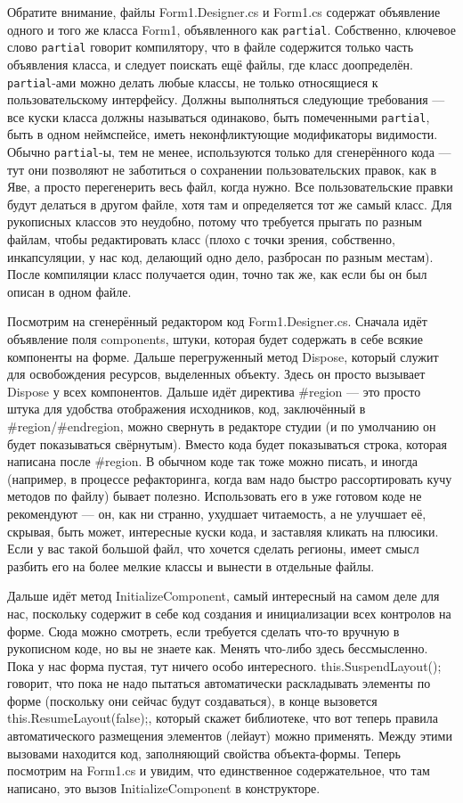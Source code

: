 \documentclass[a5paper]{article}
\begin{document}
Обратите внимание, файлы Form1.Designer.cs и Form1.cs содержат объявление одного и того же класса Form1, объявленного как \texttt{partial}. Собственно, ключевое слово \texttt{partial} говорит компилятору, что в файле содержится только часть объявления класса, и следует поискать ещё файлы, где класс доопределён. \texttt{partial}-ами можно делать любые классы, не только относящиеся к пользовательскому интерфейсу. Должны выполняться следующие требования --- все куски класса должны называться одинаково, быть помеченными \texttt{partial}, быть в одном неймспейсе, иметь неконфликтующие модификаторы видимости. Обычно \texttt{partial}-ы, тем не менее, используются только для сгенерённого кода --- тут они позволяют не заботиться о сохранении пользовательских правок, как в Яве, а просто перегенерить весь файл, когда нужно. Все пользовательские правки будут делаться в другом файле, хотя там и определяется тот же самый класс. Для рукописных классов это неудобно, потому что требуется прыгать по разным файлам, чтобы редактировать класс (плохо с точки зрения, собственно, инкапсуляции, у нас код, делающий одно дело, разбросан по разным местам). После компиляции класс получается один, точно так же, как если бы он был описан в одном файле.

Посмотрим на сгенерённый редактором код Form1.Designer.cs. Сначала идёт объявление поля components, штуки, которая будет содержать в себе всякие компоненты на форме. Дальше перегруженный метод Dispose, который служит для освобождения ресурсов, выделенных объекту. Здесь он просто вызывает Dispose у всех компонентов. Дальше идёт директива \#region --- это просто штука для удобства отображения исходников, код, заключённый в \#region/\#endregion, можно свернуть в редакторе студии (и по умолчанию он будет показываться свёрнутым). Вместо кода будет показываться строка, которая написана после \#region. В обычном коде так тоже можно писать, и иногда (например, в процессе рефакторинга, когда вам надо быстро рассортировать кучу методов по файлу) бывает полезно. Использовать его в уже готовом коде не рекомендуют --- он, как ни странно, ухудшает читаемость, а не улучшает её, скрывая, быть может, интересные куски кода, и заставляя кликать на плюсики. Если у вас такой большой файл, что хочется сделать регионы, имеет смысл разбить его на более мелкие классы и вынести в отдельные файлы.

Дальше идёт метод InitializeComponent, самый интересный на самом деле для нас, поскольку содержит в себе код создания и инициализации всех контролов на форме. Сюда можно смотреть, если требуется сделать что-то вручную в рукописном коде, но вы не знаете как. Менять что-либо здесь бессмысленно. Пока у нас форма пустая, тут ничего особо интересного. this.SuspendLayout(); говорит, что пока не надо пытаться автоматически раскладывать элементы по форме (поскольку они сейчас будут создаваться), в конце вызовется this.ResumeLayout(false);, который скажет библиотеке, что вот теперь правила автоматического размещения элементов (лейаут) можно применять. Между этими вызовами находится код, заполняющий свойства объекта-формы. Теперь посмотрим на Form1.cs и увидим, что единственное содержательное, что там написано, это вызов InitializeComponent в конструкторе. 
\end{document}
